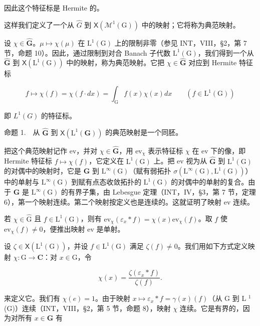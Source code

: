 因此这个特征标是 Hermite 的。

这样我们定义了一个从 \(\widehat{G}\) 到 \(\mathsf{X}(\mathcal{M}^{1}(\mathrm{G}))\) 中的映射；它将称为典范映射。

设 \(\chi \in \widehat{\mathbf{G}}\)。\(\mu \mapsto \chi(\mu)\) 在 \(\mathrm{L}^1(\mathrm{G})\) 上的限制非零（参见 INT，VIII，§2，第 7 节，命题 10）。因此，通过限制到对合 Banach 子代数 \(\mathrm{L}^1(\mathrm{G})\)，我们得到一个从 \(\widehat{\mathbf{G}}\) 到 \(\mathsf{X}(\mathrm{L}^1(\mathrm{G}))\) 中的映射，称为典范映射。它把 \(\chi \in \widehat{\mathbf{G}}\) 对应到 Hermite 特征标

\[
f \mapsto \chi (f) = \chi (f \cdot d x) = \int_ {\mathrm{G}} f (x) \chi (x) d x \qquad (f \in \mathrm{L} ^ {1} (\mathrm{G}))\tag{2}
\]

即 \(L^{1}(G)\) 的特征标。

命题 1.　从 \(\widehat{\mathbf{G}}\) 到 \(\mathsf{X}(\mathrm{L}^{1}(\mathbf{G}))\) 的典范映射是一个同胚。

把这个典范映射记作 ev，并对 \(\chi \in \widehat{\mathbf{G}}\)，用 \(\mathrm{ev}_{\chi}\) 表示特征标 \(\chi\) 在 ev 下的像，即 Hermite 特征标 \(f \mapsto \chi(f)\)，它定义在 \(\mathrm{L}^1(\mathrm{G})\) 上。把 ev 视为从 \(\widehat{\mathbf{G}}\) 到 \(\mathrm{L}^1(\mathrm{G})\) 的对偶中的映射时，它是 \(\widehat{\mathbf{G}}\) 到 \(\mathrm{L}^{\infty}(\mathrm{G})\)（赋有弱拓扑 \(\sigma(\mathrm{L}^{\infty}(\mathrm{G}), \mathrm{L}^{1}(\mathrm{G}))\)）中的单射与 \(\mathrm{L}^{\infty}(\mathrm{G})\) 到赋有点态收敛拓扑的 \(\mathrm{L}^1(\mathrm{G})\) 的对偶中的单射的复合。由于 \(\widehat{\mathbf{G}}\) 是 \(\mathrm{L}^{\infty}(\mathrm{G})\) 的有界子集，由 Lebesgue 定理（INT，IV，§3，第 7 节，定理 6），第一个映射连续。第二个映射按定义也是连续的。这就证明了映射 ev 连续。

若 \(\chi \in \widehat{\mathrm{G}}\) 且 \(f \in \mathrm{L}^1(\mathrm{G})\)，则有 \(\mathrm{ev}_{\chi}(\varepsilon_x * f) = \chi(x)\mathrm{ev}_{\chi}(f)\)。取 \(f\) 使 \(\mathrm{ev}_{\chi}(f) \neq 0\)，便推出映射 ev 是单射。

设 \(\zeta\in\mathsf{X}(\mathrm{L}^{1}(\mathrm{G}))\)，并设 \(f\in\mathrm{L}^{1}(\mathrm{G})\) 满足 \(\zeta(f)\neq0\)。我们用如下方式定义映射 \(\chi\colon\mathrm{G}\to\mathbf{C}\)：对 \(x\in\mathrm{G}\)，令

\[
\chi (x) = \frac {\zeta (\varepsilon_ {x} * f)}{\zeta (f)}.\tag{3}
\]

来定义它。我们有 \(\chi(e) = 1\)。由于映射 \(x \mapsto \varepsilon_x * f = \gamma(x)(f)\)（从 G 到 L \(^1\) (G)）连续（INT，VIII，§2，第 5 节，命题 8），映射 \(\chi\) 连续。它是有界的，因为对所有 \(x \in \mathbf{G}\) 有

